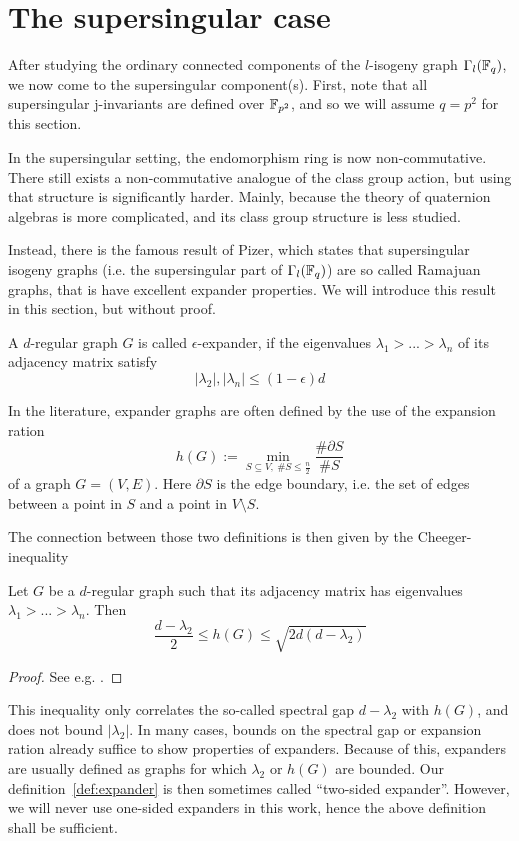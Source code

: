 \section{The supersingular case}
\label{sec:supersingular_isogeny_graph}
After studying the ordinary connected components of the $l$-isogeny graph $\Gamma_l(\mathbb{F}_q)$, we now come to the supersingular component(s).
First, note that all supersingular j-invariants are defined over $\mathbb{F}_{p^2}$, and so we will assume $q = p^2$ for this section.

In the supersingular setting, the endomorphism ring is now non-commutative.
There still exists a non-commutative analogue of the class group action, but using that structure is significantly harder.
Mainly, because the theory of quaternion algebras is more complicated, and its class group structure is less studied.

Instead, there is the famous result of Pizer, which states that supersingular isogeny graphs (i.e. the supersingular part of $\Gamma_l(\mathbb{F}_q)$) are so called Ramajuan graphs, that is have excellent expander properties.
We will introduce this result in this section, but without proof.
\begin{definition}
    \label{def:expander}
    A $d$-regular graph $G$ is called $\epsilon$-expander, if the eigenvalues $\lambda_1 > ... > \lambda_n$ of its adjacency matrix satisfy
    \begin{equation*}
        |\lambda_2|, |\lambda_n| \leq (1 - \epsilon) d
    \end{equation*}
\end{definition}
In the literature, expander graphs are often defined by the use of the expansion ration
\begin{equation*}
    h(G) := \min_{S \subseteq V, \ \#S \leq \frac n 2} \frac {\#\partial S} {\# S}
\end{equation*}
of a graph $G = (V, E)$.
Here $\partial S$ is the edge boundary, i.e. the set of edges between a point in $S$ and a point in $V \setminus S$.

The connection between those two definitions is then given by the Cheeger-inequality
\begin{prop}
    Let $G$ be a $d$-regular graph such that its adjacency matrix has eigenvalues $\lambda_1 > ... > \lambda_n$.
    Then
    \begin{equation*}
        \frac {d - \lambda_2} 2 \leq h(G) \leq \sqrt{2d(d - \lambda_2)}
    \end{equation*}
\end{prop}
\begin{proof}
    See e.g. \cite{cheeger_inequality}.
\end{proof}
This inequality only correlates the so-called spectral gap $d - \lambda_2$ with $h(G)$, and does not bound $|\lambda_2|$.
In many cases, bounds on the spectral gap or expansion ration already suffice to show properties of expanders.
Because of this, expanders are usually defined as graphs for which $\lambda_2$ or $h(G)$ are bounded.
Our definition~\ref{def:expander} is then sometimes called ``two-sided expander''.
However, we will never use one-sided expanders in this work, hence the above definition shall be sufficient.

